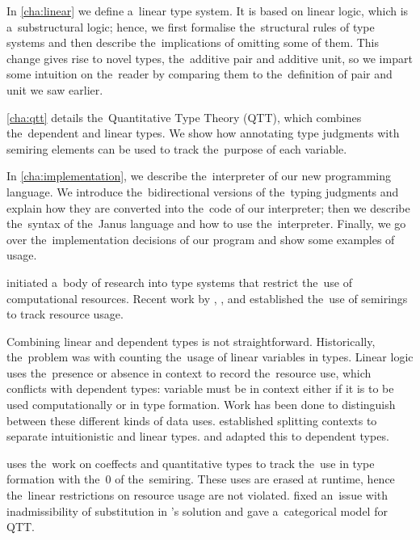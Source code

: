 In \autoref{cha:linear} we define a~linear type system. It is based on linear
logic, which is a~substructural logic; hence, we first formalise the~structural
rules of type systems and then describe the~implications of omitting some of
them. This change gives rise to novel types, the~additive pair and additive
unit, so we impart some intuition on the~reader by comparing them to
the~definition of pair and unit we saw earlier.

\autoref{cha:qtt} details the~Quantitative Type Theory (QTT), which combines
the~dependent and linear types. We show how annotating type judgments with
semiring elements can be used to track the~purpose of each variable.

In \autoref{cha:implementation}, we describe the~interpreter of our new
programming language. We introduce the~bidirectional versions of the~typing
judgments and explain how they are converted into the~code of our interpreter;
then we describe the~syntax of the~Janus language and how to use
the~interpreter. Finally, we go over the~implementation decisions of our program
and show some examples of usage.


\citet{girard_1987} initiated a~body of research into type systems that restrict
the~use of computational resources. Recent work by \citet{petricek_et_al_2014},
\citet{brunel_et_al_2014}, and \citet{ghica_smith_2014} established the~use of
semirings to track resource usage.

Combining linear and dependent types is not straightforward. Historically,
the~problem was with counting the~usage of linear variables in types.
Linear logic uses the~presence or absence in context to record the~resource use,
which conflicts with dependent types: variable must be in context either if it
is to be used computationally or in type formation. Work has been done to
distinguish between these different kinds of data uses. \citet{barber_1996}
established splitting contexts to separate intuitionistic and linear types.
\citet{cervesato_pfenning_2002} and \citet{krishnaswami_et_al_2015} adapted this
to dependent types.

\citet{mcbride_2016} uses the~work on coeffects and quantitative types to track
the~use in type formation with the~0 of the~semiring. These uses are erased at
runtime, hence the~linear restrictions on resource usage are not violated.
\citet{atkey_2018} fixed an~issue with inadmissibility of substitution in
\citeauthor{mcbride_2016}'s solution and gave a~categorical model for QTT.

